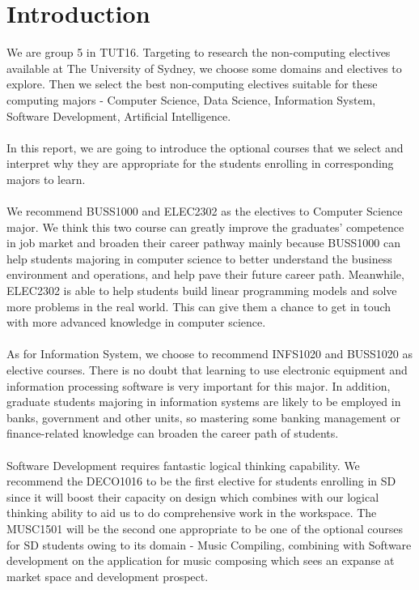 \documentclass{article}
\begin{document}
	\section{Introduction}
	We are group 5 in TUT16. Targeting to research the non-computing electives available at The University of Sydney, we choose some domains and electives to explore. Then we select the best non-computing electives suitable for these computing majors - Computer Science, Data Science, Information System, Software Development, Artificial Intelligence. \\
	\\
	In this report, we are going to introduce the optional courses that we select and interpret why they are appropriate for the students enrolling in corresponding majors to learn.\\
	\\
	We recommend BUSS1000 and ELEC2302 as the electives to Computer Science major. We think this two course can greatly improve the graduates’ competence in job market and broaden their career pathway mainly because BUSS1000 can help students majoring in computer science to better understand the business environment and operations, and help pave their future career path. Meanwhile, ELEC2302 is able to help students build linear programming models and solve more problems in the real world. This can give them a chance to get in touch with more advanced knowledge in computer science. \\
	\\
	As for Information System, we choose to recommend INFS1020 and BUSS1020 as elective courses. There is no doubt that learning to use electronic equipment and information processing software is very important for this major. In addition, graduate students majoring in information systems are likely to be employed in banks, government and other units, so mastering some banking management or finance-related knowledge can broaden the career path of students.\\
	\\
	Software Development requires fantastic logical thinking capability. We recommend the DECO1016 to be the first elective for students enrolling in SD since it will boost their capacity on design which combines with our logical thinking ability to aid us to do comprehensive work in the workspace. The MUSC1501 will be the second one appropriate to be one of the optional courses for SD students owing to its domain - Music Compiling, combining with Software development on the application for music composing which sees an expanse at market space and development prospect.\\
\end{document}
